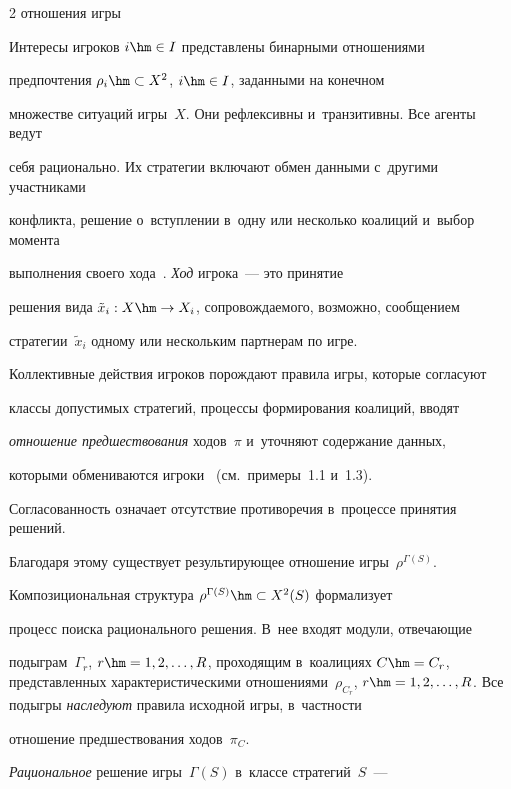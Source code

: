 \begin{multicols}{2}
{отношения игры}

   

    Интересы игроков $i\hm\in I$ пред\-став\-ле\-ны бинарными отношениями 

предпочтения $\rho_i\hm\subset X^2$, $i\hm\in I$, заданными на конечном 

множестве ситуаций игры~$X$. Они реф\-лек\-сив\-ны и~тран\-зи\-тив\-ны. Все агенты ведут 

себя рационально. Их стратегии включают обмен данными с~другими участниками 

конфликта, решение о~вступ\-ле\-нии в~одну или несколько коалиций и~выбор момента 

выполнения своего хода~\cite{1-vas, 5-vas}. \textit{Ход} игрока~--- это принятие 

решения вида $\tilde{x}_i : X\hm\to X_i$, со\-про\-вож\-да\-емо\-го, воз\-мож\-но, сообщением 

стратегии~$\tilde{x}_i$ одному или нескольким парт\-не\-рам по игре. 

    

    Коллективные действия игроков порождают правила игры, которые согласуют 

классы до\-пус\-ти\-мых стратегий, процессы формирования коалиций, вводят 

\textit{отношение предшествования} ходов~$\pi$ и~уточ\-ня\-ют содержание данных, 

которыми обмениваются игроки~\cite{5-vas} (см.\ примеры~1.1 и~1.3). 

Со\-гла\-со\-ван\-ность означает отсутствие противоречия в~процессе принятия решений. 

Благодаря этому существует ре\-зуль\-ти\-ру\-ющее отношение игры~$\rho^{\Gamma(S)}$. 

Композициональная структура $\rho^{\Gamma(S)} \hm\subset X^2(S)$ формализует 

процесс поиска рационального решения. В~нее входят модули, от\-ве\-ча\-ющие 

подыграм~$\Gamma_r$, $r\hm= 1,2, \ldots , R$, проходящим в~коалициях $C\hm= 

C_r$, пред\-став\-лен\-ных характеристическими отношениями~$\rho_{C_r}$, $r\hm= 

1,2,\ldots , R$. Все подыгры \textit{на\-сле\-ду\-ют} правила исходной игры, в~част\-ности 

отношение пред\-шест\-во\-ва\-ния ходов~$\pi_C$.

    

    \textit{Рациональное} решение игры~$\Gamma(S)$ в~классе стратегий~$S$~--- 


\end{multicols}
